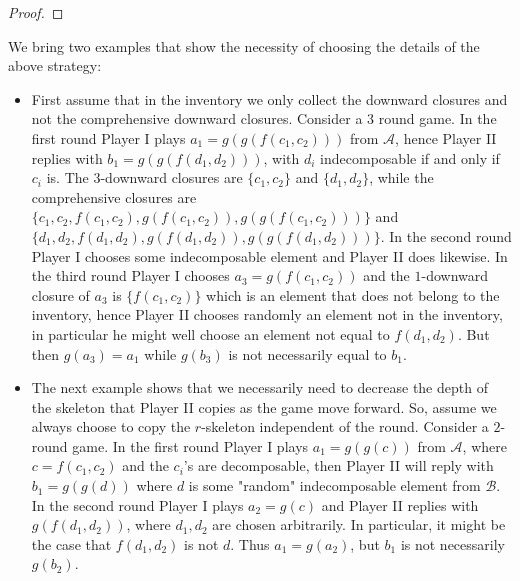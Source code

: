 \documentclass[a4paper,11pt]{article}
\begin{document}
\begin{proof}
\end{proof}

\begin{example}
We bring two examples that show the necessity of choosing the details of the above strategy:   
\ \begin{itemize}
\item First assume that in the inventory we only collect the downward closures and not the comprehensive downward closures. Consider a $3$ round game. In the first round Player I plays $a_1=g(g(f(c_1, c_2)))$ from $\mathcal{A}$, hence Player II replies with $b_1=g(g(f(d_1,d_2)))$, with $d_i$ indecomposable if and only if $c_i$ is. The $3$-downward closures are $\{c_1, c_2\}$ and $\{d_1, d_2\}$, while the comprehensive closures are $\{c_1, c_2, f(c_1, c_2), g(f(c_1, c_2)), g(g(f(c_1, c_2))) \}$ and $\{d_1, d_2, f(d_1,d_2), g(f(d_1,d_2)), g(g(f(d_1,d_2)))\}$. In the second round Player I chooses some indecomposable element and Player II does likewise. In the third round Player I chooses $a_3=g(f(c_1,c_2))$ and the $1$-downward closure of $a_3$ is $\{f(c_1,c_2)\}$ which is an element that does not belong to the inventory, hence Player II chooses randomly an element not in the inventory, in particular he might well choose an element not equal to $f(d_1, d_2)$. But then $g(a_3)=a_1$ while $g(b_3)$ is not necessarily equal to $b_1$.
\item The next example shows that we necessarily need to decrease the depth of the skeleton that Player II copies as the game move forward. So, assume we always choose to copy the $r$-skeleton independent of the round. Consider a $2$-round game. In the first round Player I plays $a_1=g(g(c))$ from $\mathcal{A}$, where $c=f(c_1, c_2)$ and the $c_i$'s are decomposable, then Player II will reply with $b_1=g(g(d))$ where $d$ is some "random" indecomposable element from $\mathcal{B}$. In the second round Player I plays $a_2=g(c)$ and Player II replies with $g(f(d_1, d_2))$, where $d_1, d_2$ are chosen arbitrarily. In particular, it might be the case that $f(d_1, d_2)$ is not $d$. Thus $a_1=g(a_2)$, but $b_1$ is not necessarily $g(b_2)$.      
\end{itemize}
\end{example}
\end{document}
